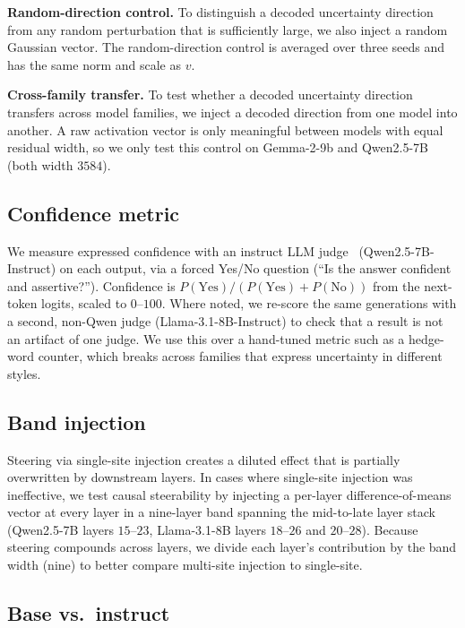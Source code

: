 \documentclass{article}
\begin{document}
\textbf{Random-direction control.} To distinguish a decoded uncertainty direction from any random perturbation that is sufficiently large, we also inject a random Gaussian vector. The random-direction control is averaged over three seeds and has the same norm and scale as $v$.

\textbf{Cross-family transfer.} To test whether a decoded uncertainty direction transfers across model families, we inject a decoded direction from one model into another. A raw activation vector is only meaningful between models with equal residual width, so we only test this control on Gemma-2-9b and Qwen2.5-7B (both width $3584$).

\subsection{Confidence metric}
\label{sec:confidence}

We measure expressed confidence with an instruct LLM judge~\citep{zheng2023judging} (Qwen2.5-7B-Instruct) on each output, via a forced Yes/No question (``Is the answer confident and assertive?''). Confidence is $P(\text{Yes})/(P(\text{Yes})+P(\text{No}))$ from the next-token logits, scaled to $0$--$100$. Where noted, we re-score the same generations with a second, non-Qwen judge (Llama-3.1-8B-Instruct) to check that a result is not an artifact of one judge. We use this over a hand-tuned metric such as a hedge-word counter, which breaks across families that express uncertainty in different styles.

\subsection{Band injection}

Steering via single-site injection creates a diluted effect that is partially overwritten by downstream layers. In cases where single-site injection was ineffective, we test causal steerability by injecting a per-layer difference-of-means vector at every layer in a nine-layer band spanning the mid-to-late layer stack (Qwen2.5-7B layers $15$--$23$, Llama-3.1-8B layers $18$--$26$ and $20$--$28$). Because steering compounds across layers, we divide each layer's contribution by the band width (nine) to better compare multi-site injection to single-site.

\subsection{Base vs.\ instruct}
\end{document}
